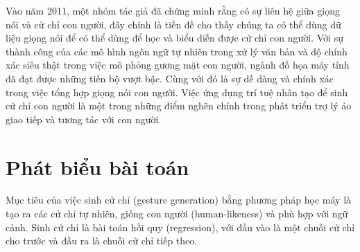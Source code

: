 Vào năm 2011, một nhóm tác giả \cite{bergmann2011relation} đã chứng minh rằng có sự liên hệ giữa giọng nói và cử chỉ con người, đây chính là tiền đề cho thấy chúng ta có thể dùng dữ liệu giọng nói để có thể dùng để học và biểu diễn được cử chỉ con người.
Với sự thành công của các mô hình ngôn ngữ tự nhiên trong xử lý văn bản và độ chính xác siêu thật trong việc mô phỏng gương mặt con người, ngành đồ họa máy tính đã đạt được những tiến bộ vượt bậc. Cùng với đó là sự dễ dàng và chính xác trong việc tổng hợp giọng nói con người.
Việc ứng dụng trí tuệ nhân tạo để sinh cử chỉ con người là một trong những điểm nghẽn chính trong phát triển trợ lý ảo giao tiếp và tương tác với con người.

\section{Phát biểu bài toán}

Mục tiêu của việc sinh cử chỉ (gesture generation) bằng phương pháp học máy là tạo ra các cử chỉ tự nhiên, giống con người (human-likeness) và phù hợp với ngữ cảnh.
Sinh cử chỉ là bài toán hồi quy (regression), với đầu vào là một chuỗi cử chỉ cho trước và đầu ra là chuỗi cử chỉ tiếp theo.

